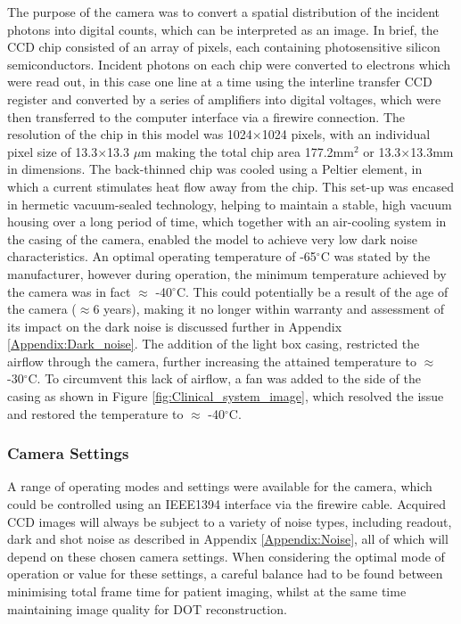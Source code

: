 \documentclass[twoside]{bhamthesis}
\theoremstyle{definition}
\begin{document}
The purpose of the camera was to convert a spatial distribution of the incident photons into digital counts, which can be interpreted as an image. In brief, the CCD chip consisted of an array of pixels, each containing photosensitive silicon semiconductors. Incident photons on each chip were converted to electrons which were read out, in this case one line at a time using the interline transfer CCD register and converted by a series of amplifiers into digital voltages, which were then transferred to the computer interface via a firewire connection. The resolution of the chip in this model was 1024$\times$1024 pixels, with an individual pixel size of 13.3$\times$13.3 $\mu$m making the total chip area 177.2mm$^2$ or 13.3$\times$13.3mm in dimensions. The back-thinned chip was cooled using a Peltier element, in which a current stimulates heat flow away from the chip. This set-up was encased in hermetic vacuum-sealed technology, helping to maintain a stable, high vacuum housing over a long period of time, which together with an air-cooling system in the casing of the camera, enabled the model to achieve very low dark noise characteristics. An optimal operating temperature of -65$^\circ$C was stated by the manufacturer, however during operation, the minimum temperature achieved by the camera was in fact $\approx$ -40$^\circ$C. This could potentially be a result of the age of the camera ($\approx$6 years), making it no longer within warranty and assessment of its impact on the dark noise is discussed further in Appendix \ref{Appendix:Dark_noise}. The addition of the light box casing, restricted the airflow through the camera, further increasing the attained temperature to $\approx$ -30$^\circ$C. To circumvent this lack of airflow, a fan was added to the side of the casing as shown in Figure \ref{fig:Clinical_system_image}, which resolved the issue and restored the temperature to $\approx$ -40$^\circ$C. 

\subsubsection{Camera Settings}

A range of operating modes and settings were available for the camera, which could be controlled using an IEEE1394 interface via the firewire cable. Acquired CCD images will always be subject to a variety of noise types, including readout, dark and shot noise as described in Appendix \ref{Appendix:Noise}, all of which will depend on these chosen camera settings. When considering the optimal mode of operation or value for these settings, a careful balance had to be found between minimising total frame time for patient imaging, whilst at the same time maintaining image quality for DOT reconstruction.
\end{document}
